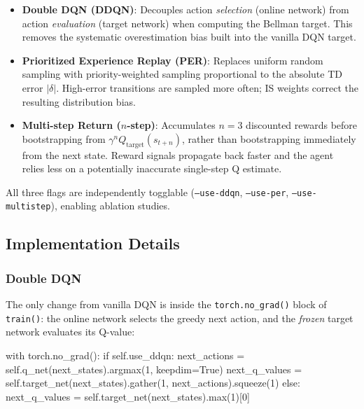\documentclass[12pt,a4paper]{report}
\begin{document}
\begin{itemize}[leftmargin=1.8em]
  \item \textbf{Double DQN (DDQN)}: Decouples action \emph{selection} (online network)
        from action \emph{evaluation} (target network) when computing the Bellman target.
        This removes the systematic overestimation bias built into the vanilla DQN target.

  \item \textbf{Prioritized Experience Replay (PER)}: Replaces uniform random sampling
        with priority-weighted sampling proportional to the absolute TD error $|\delta|$.
        High-error transitions are sampled more often; IS weights correct the resulting
        distribution bias.

  \item \textbf{Multi-step Return ($n$-step)}: Accumulates $n = 3$ discounted rewards
        before bootstrapping from $\gamma^n Q_{\text{target}}(s_{t+n})$, rather than
        bootstrapping immediately from the next state.
        Reward signals propagate back faster and the agent relies less on a potentially
        inaccurate single-step Q estimate.
\end{itemize}

All three flags are independently togglable (\texttt{--use-ddqn}, \texttt{--use-per},
\texttt{--use-multistep}), enabling ablation studies.

\subsection{Implementation Details}

\subsubsection*{Double DQN}

The only change from vanilla DQN is inside the \texttt{torch.no\_grad()} block of
\texttt{train()}: the online network selects the greedy next action, and the
\emph{frozen} target network evaluates its Q-value:

\begin{pycode}
with torch.no_grad():
    if self.use_ddqn:
        next_actions  = self.q_net(next_states).argmax(1, keepdim=True)
        next_q_values = self.target_net(next_states).gather(1, next_actions).squeeze(1)
    else:
        next_q_values = self.target_net(next_states).max(1)[0]
\end{pycode}
\end{document}
